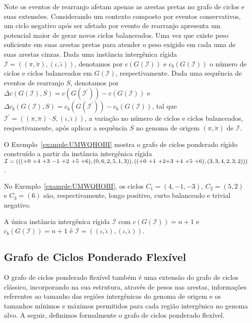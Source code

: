 Note os eventos de rearranjo afetam apenas as arestas pretas no grafo de ciclos e suas extensões. Considerando um contexto composto por eventos conservativos, um ciclo negativo após ser afetado por evento de rearranjo apresenta um potencial maior de gerar novos ciclos balanceados. Uma vez que existe peso suficiente em suas arestas pretas para atender o peso exigido em cada uma de suas arestas cinzas. Dada uma instância intergênica rígida $\mathcal{I} = ((\pi,\breve\pi),(\iota,\breve\iota))$, denotamos por $c(G(\mathcal{I}))$ e $c_b(G(\mathcal{I}))$ o número de ciclos e ciclos balanceados em $G(\mathcal{I})$, respectivamente. Dada uma sequência de eventos de rearranjo $S$, denotamos por $\Delta c(G(\mathcal{I}), S) = c(G(\mathcal{I^{\prime}})) - c(G(\mathcal{I}))$ e $\Delta c_b(G(\mathcal{I}), S) = c_b(G(\mathcal{I^{\prime}})) - c_b(G(\mathcal{I}))$, tal que $\mathcal{I^{\prime}} = ((\pi,\breve\pi) \cdot S,(\iota,\breve\iota))$, a variação no número de ciclos e ciclos balanceados, respectivamente, após aplicar a sequência $S$ no genoma de origem $(\pi,\breve\pi)$ de $\mathcal{I}$.

O Exemplo~\ref{example:UMWQHOBI} mostra o grafo de ciclos ponderado rígido construído a partir da instância intergênica rígida $\mathcal{I} = ((({+0}~{+4}~{+3}~{-1}~{+2}~{+5}~{+6}),(0,6,2,5,1,3)),(({+0}~{+1}~{+2}\break{+3}~{+4}~{+5}~{+6}),(3,3,4,2,3,2)))$.



No Exemplo~\ref{example:UMWQHOBI}, os ciclos $C_1=(4,-1,-3)$, $C_2 = (5,2)$ e $C_3 = (6)$ são, respectivamente, longo positivo, curto balanceado e trivial negativo.

\begin{remark}\label{remark:WVLFPRDL}
  A única instância intergênica rígida $\mathcal{I}$ com $c(G(\mathcal{I})) = n + 1$ e $c_b(G(\mathcal{I})) = n + 1$ é $\mathcal{I} = ((\iota,\breve\iota),(\iota,\breve\iota))$.
\end{remark}

\subsection{Grafo de Ciclos Ponderado Flexível}

O grafo de ciclos ponderado flexível também é uma extensão do grafo de ciclos clássico, incorporando na sua estrutura, através de pesos nas arestas, informações referentes ao tamanho das regiões intergênicas do genoma de origem e os tamanhos mínimos e máximos permitidos para cada região intergênica no genoma alvo. A seguir, definimos formalmente o grafo de ciclos ponderado flexível.

